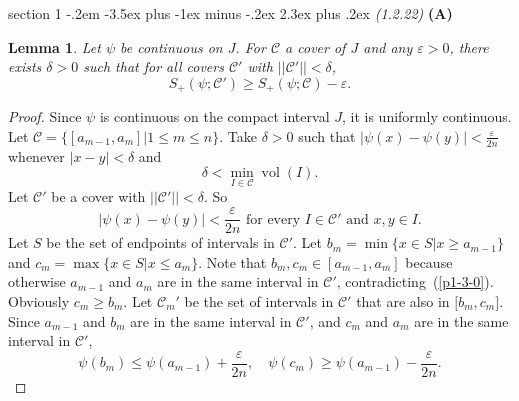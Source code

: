 \documentclass[12pt]{article}
\makeatletter
\theoremstyle{norm}
\newtheorem{lem}[thm]{Lemma}
\providecommand{\cal}[1]{\mathcal{#1}}
\renewcommand{\cal}[1]{\mathcal{#1}}
\newcommand{\de}[0]{\delta}
\newcommand{\De}[0]{\Delta}
\newcommand{\ep}[0]{\varepsilon}
\newcommand{\subprob}[1]{\noindent\textbf{#1}\\}
\newcommand{\vol}[0]{\operatorname{vol}}
\newenvironment{problem}{\@startsection
       {section}
       {1}
       {-.2em}
       {-3.5ex plus -1ex minus -.2ex}
       {2.3ex plus .2ex}
       {\pagebreak[3]%
       \large\bf\noindent{Problem }
       }
       }
       {%
       }
\makeatother
\begin{document}
\begin{problem} {\it (1.2.22)}
\subprob{(A)}
\begin{lem}\label{p1-3-l1}
Let $\psi$ be continuous on $J$.
For $\cal C$ a cover of $J$ and any $\ep>0$, there exists $\de>0$ such that for all covers $\cal C'$ with $||\cal C'||<\de$, 
\[
S_+(\psi;\cal C')\geq S_+(\psi;\cal C)-\ep.
\]
\end{lem}
\begin{proof}
Since $\psi$ is continuous on the compact interval $J$, it is uniformly continuous. Let $\cal C=\{[a_{m-1},a_m]|1\leq m\leq n\}$. 
Take $\de>0$ such that $|\psi(x)-\psi(y)|<\frac{\ep}{2n}$ whenever $|x-y|<\de$ and \begin{equation}\label{p1-3-0}
\de<%
\min_{I\in \cal C} \vol(I)%
.\end{equation} %
Let $\cal C'$ be a cover with $||\cal C'||<\de$. So 
\begin{equation}\label{p1-3-1}
|\psi(x)-\psi(y)|<\frac{\ep}{2n}\text{ for every }I\in \cal C'\text{ and }x,y\in I.\end{equation}
Let $S$ be the set of endpoints of intervals in $\cal C'$. %
Let $b_m=\min\{x\in S|x\geq a_{m-1}\}$ and $c_m=\max\{x\in S|x\leq a_{m}\}$. %
Note that $b_m,c_m\in [a_{m-1},a_m]$ because otherwise $a_{m-1}$ and $a_m$ are in the same interval in $\cal C'$, contradicting~(\ref{p1-3-0}).
Obviously $c_m\geq b_m$. Let $\cal C_m'$ be the set of intervals in $\cal C'$ that are also in $\cal [b_m,c_m]$. Since $a_{m-1}$ and $b_m$ are in the same interval in $\cal C'$, and $c_m$ and $a_{m}$ are in the same interval in $\cal C'$,
\[
\psi(b_m)\leq \psi(a_{m-1})+\frac{\ep}{2n},\quad \psi(c_m)\geq \psi(a_{m-1})-\frac{\ep}{2n}.
\]

\end{proof}
\end{problem}
\end{document}
